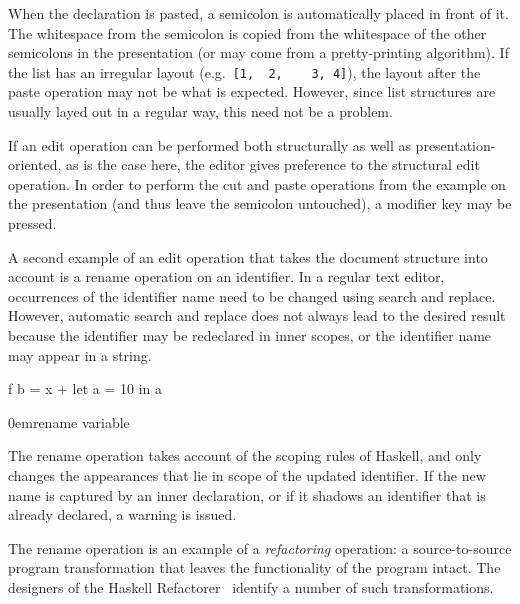 \documentclass{speauth}
\begin{document}


When the declaration is pasted, a semicolon is automatically placed in front of it. The whitespace from the semicolon is copied from the whitespace of the other semicolons in the presentation (or may come from a pretty-printing algorithm). If the list has an irregular layout (e.g.\ \verb|[1,  2,    3, 4]|), the layout after the paste operation may not be what is expected. However, since list structures are usually layed out in a regular way, this need not be a problem.

If an edit operation can be performed both structurally as well as presentation-oriented, as is the case here, the editor gives preference to the structural edit operation. In order to perform the cut and paste operations from the example on the presentation (and thus leave the semicolon untouched), a modifier key may be pressed.



A second example of an edit operation that takes the document structure into account is a rename operation on an identifier. In a regular text editor, occurrences of the identifier name need to be changed using search and replace. However, automatic search and replace does not always lead to the desired result because the identifier may be redeclared in inner scopes, or the identifier name may appear in a string.

{\begin{scriptsize} f  b = x + let a = 10 in a \end{scriptsize}}
{0em}{\small rename variable}

The rename operation takes account of the scoping rules of Haskell, and only changes the appearances that lie in scope of the updated identifier. If the new name is captured by an inner declaration, or if it shadows an identifier that is already declared, a warning is issued.

The rename operation is an example of a {\em refactoring} operation: a source-to-source program transformation that leaves  the functionality of the program intact. The designers of the Haskell Refactorer~\cite{reinke03refactoring} identify a number of such transformations.
\end{document}
